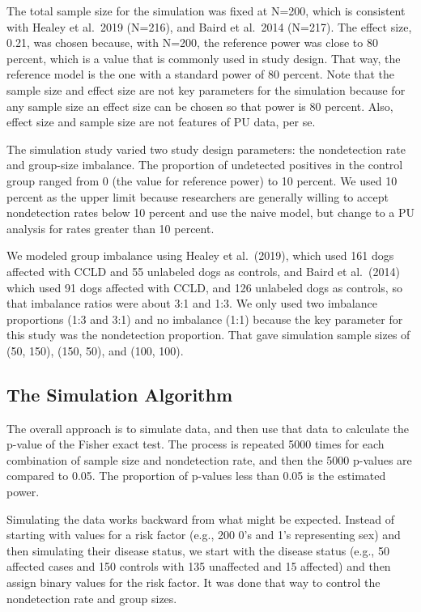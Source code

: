 \documentclass[
]{article}
\begin{document}
The total sample size for the simulation was fixed at N=200, which is
consistent with Healey et al.~2019 (N=216), and Baird et al.~2014
(N=217).\cite{bcioa14, hmhcbhkr19} The effect size, 0.21, was chosen
because, with N=200, the reference power was close to 80 percent, which
is a value that is commonly used in study design. That way, the
reference model is the one with a standard power of 80 percent. Note
that the sample size and effect size are not key parameters for the
simulation because for any sample size an effect size can be chosen so
that power is 80 percent. Also, effect size and sample size are not
features of PU data, per se.

The simulation study varied two study design parameters: the
nondetection rate and group-size imbalance. The proportion of undetected
positives in the control group ranged from 0 (the value for reference
power) to 10 percent. We used 10 percent as the upper limit because
researchers are generally willing to accept nondetection rates below 10
percent and use the naive model, but change to a PU analysis for rates
greater than 10 percent.\cite{bd20}

We modeled group imbalance using Healey et al.~(2019), which used 161
dogs affected with CCLD and 55 unlabeled dogs as controls, and Baird et
al.~(2014) which used 91 dogs affected with CCLD, and 126 unlabeled dogs
as controls, so that imbalance ratios were about 3:1 and
1:3.\cite{bcioa14, hmhcbhkr19} We only used two imbalance proportions
(1:3 and 3:1) and no imbalance (1:1) because the key parameter for this
study was the nondetection proportion. That gave simulation sample sizes
of (50, 150), (150, 50), and (100, 100).

\hypertarget{the-simulation-algorithm}{%
\subsection{The Simulation Algorithm}\label{the-simulation-algorithm}}

The overall approach is to simulate data, and then use that data to
calculate the p-value of the Fisher exact test. The process is repeated
5000 times for each combination of sample size and nondetection rate,
and then the 5000 p-values are compared to 0.05. The proportion of
p-values less than 0.05 is the estimated power.

Simulating the data works backward from what might be expected. Instead
of starting with values for a risk factor (e.g., 200 0's and 1's
representing sex) and then simulating their disease status, we start
with the disease status (e.g., 50 affected cases and 150 controls with
135 unaffected and 15 affected) and then assign binary values for the
risk factor. It was done that way to control the nondetection rate and
group sizes.
\end{document}
